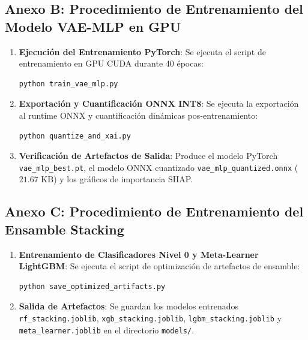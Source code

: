 \subsection{Anexo B: Procedimiento de Entrenamiento del Modelo VAE-MLP en GPU}
\begin{enumerate}[leftmargin=*]
    \item \textbf{Ejecución del Entrenamiento PyTorch}: Se ejecuta el script de entrenamiento en GPU CUDA durante 40 épocas:
    \begin{lstlisting}[language=bash]
    python train_vae_mlp.py
    \end{lstlisting}
    \item \textbf{Exportación y Cuantificación ONNX INT8}: Se ejecuta la exportación al runtime ONNX y cuantificación dinámicas pos-entrenamiento:
    \begin{lstlisting}[language=bash]
    python quantize_and_xai.py
    \end{lstlisting}
    \item \textbf{Verificación de Artefactos de Salida}: Produce el modelo PyTorch \texttt{vae\_mlp\_best.pt}, el modelo ONNX cuantizado \texttt{vae\_mlp\_quantized.onnx} ($21.67\text{ KB}$) y los gráficos de importancia SHAP.
\end{enumerate}

\subsection{Anexo C: Procedimiento de Entrenamiento del Ensamble Stacking}
\begin{enumerate}[leftmargin=*]
    \item \textbf{Entrenamiento de Clasificadores Nivel 0 y Meta-Learner LightGBM}: Se ejecuta el script de optimización de artefactos de ensamble:
    \begin{lstlisting}[language=bash]
    python save_optimized_artifacts.py
    \end{lstlisting}
    \item \textbf{Salida de Artefactos}: Se guardan los modelos entrenados \texttt{rf\_stacking.joblib}, \texttt{xgb\_stacking.joblib}, \texttt{lgbm\_stacking.joblib} y \texttt{meta\_learner.joblib} en el directorio \texttt{models/}.
\end{enumerate}

